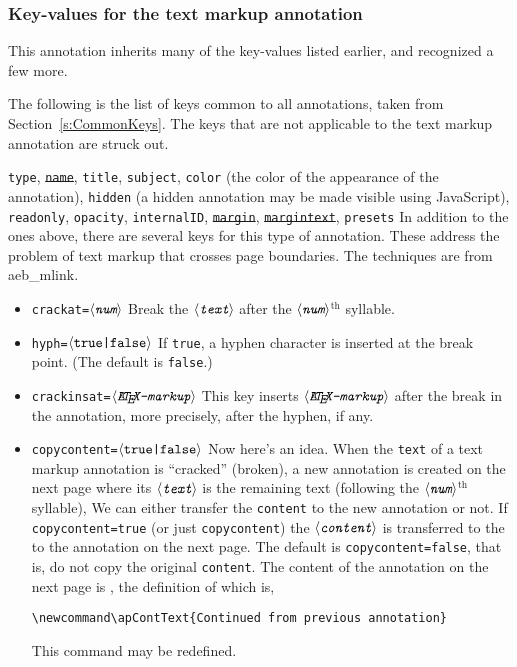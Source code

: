 \documentclass[12pt]{article}
\makeatletter
\def\pkg{\textsf}
\let\key\texttt
\def\ameta#1{$\langle\textit{\texttt{#1}}\rangle$}
\renewenvironment{quote}[1][]
   {\def\@rgi{#1}\ifx\@rgi\@empty
    \let\rghtm\@empty\else\def\rghtm{\rightmargin\leftmargin}\fi
    \list{}{\rghtm} %
    \item\relax}
   {\endlist}
\makeatother
\begin{document}
\subsubsection{Key-values for the text markup annotation}

This annotation inherits many of the key-values listed earlier, and recognized a few more.

The following is the list of keys common to all annotations, taken from Section~\ref{s:CommonKeys}.
The keys that are not applicable to the text markup annotation are struck out.
\begin{quote}
\key{type}, \key{\st{name}}, \key{title}, \key{subject}, \key{color} (the
color of the appearance of the annotation), \key{hidden} (a hidden
annotation may be made visible using JavaScript), \key{readonly},
\key{opacity}, \key{internalID}, \key{\st{margin}}, \key{\st{margintext}},
\key{presets}
\end{quote}
In addition to the ones above, there are several keys for this type of annotation. These address the problem
of text markup that crosses page boundaries. The techniques are from \pkg{aeb\_mlink}.
\begin{itemize}
   \item \key{crackat=\ameta{num}} Break the \ameta{text} after the \ameta{num}${}^{\text{th}}$ syllable.
   \item \key{hyph=\ameta{\upshape{true|false}}} If \texttt{true}, a hyphen character is inserted at the break point.
   (The default is \texttt{false}.)
   \item \key{crackinsat={\ameta{\LaTeX-markup}}} This key inserts \ameta{\LaTeX-markup} after the
   break in the annotation, more precisely, after the hyphen, if any.
   \item \key{copycontent=\ameta{\upshape{true|false}}} Now here's an idea.
       When the \key{text} of a text markup annotation is ``cracked''
       (broken), a new annotation is created on the next page where its
       \ameta{text} is the remaining text (following the
       \ameta{num}${}^{\text{th}}$ syllable), We can either transfer the
       \key{content} to the new annotation or not. If
       \key{copycontent=true} (or just \key{copycontent}) the
       \ameta{content} is transferred to the to the annotation on the next
       page. The default is \key{copycontent=false}, that is, do not copy
       the original \key{content}. The content of the annotation on the
       next page is , the definition of which is,
\begin{Verbatim}[fontsize=\small]
\newcommand\apContText{Continued from previous annotation}
\end{Verbatim}
This command may be redefined.
\end{itemize}
\end{document}
